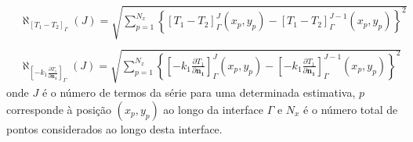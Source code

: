 %

 
\begin{align}
& \aleph_{[T_1 - T_2]_\Gamma}(J) = \sqrt{\sum_{p=1}^{N_x} \left\lbrace [T_1 - T_2]_\Gamma^J(x_p, y_p) - [T_1 - T_2]_\Gamma^{J-1}(x_p, y_p) \right\rbrace^2 } \label{metrica_norma_1} \\ \nonumber \\
& \aleph_{\left[- k_1 \frac{\partial T_1}{\partial\mathbf{n_1}}\right]_\Gamma}(J) = \sqrt{\sum_{p=1}^{N_x} \left\lbrace \left[- k_1 \frac{\partial T_1}{\partial\mathbf{n_1}}\right]_\Gamma^J(x_p, y_p) - \left[- k_1 \frac{\partial T_1}{\partial\mathbf{n_1}}\right]_\Gamma^{J-1}(x_p, y_p) \right\rbrace^2 } \label{metrica_norma_2}
\end{align}
onde $J$ é o número de termos da série para uma determinada estimativa, $p$ corresponde à posição $(x_p, y_p)$ ao longo da interface $\Gamma$ e $N_x$ é o número total de pontos considerados ao longo desta interface.



